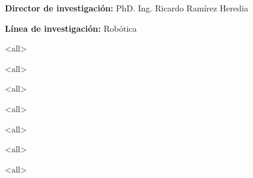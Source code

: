 \date{}



\renewcommand{\tablename}{Tabla}

\maketitle
{}
{\large\textbf{Director de investigaci\'on:} PhD. Ing. Ricardo Ram\'irez Heredia}\par\vspace{0.7cm}
{\large\textbf{L\'inea de investigaci\'on:} Rob\'otica}

\mode<all>

\mode<all>

\mode<all>

\mode<all>

\mode<all>

\mode<all>

% 
\mode<all>

\mode*

% 
% 



